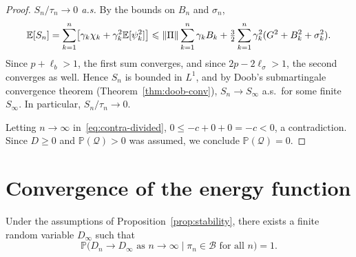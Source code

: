 \documentclass[a4paper,oneside,11pt]{report}
\newcommand{\Prob}{\mathbb{P}}
\newcommand{\calB}{\mathcal{B}}
\newcommand{\calQ}{\mathcal{Q}}
\newcommand{\norm}[1]{\| #1 \|}
\numberwithin{theorem}{chapter}
\numberwithin{equation}{chapter}
\begin{document}
\begin{proof}
  \emph{$S_n/\tau_n \to 0$ a.s.}\; By the bounds on $B_n$ and
  $\sigma_n$,
  \begin{equation}
    \E[S_n] = \sum_{k=1}^n \bigl[\gamma_k \chi_k
      + \gamma_k^2 \E[\psi_k^2]\bigr]
    \le \norm{\Pi}\sum_{k=1}^n \gamma_k B_k
    + \tfrac{3}{2}\sum_{k=1}^n \gamma_k^2(G^2 + B_k^2 + \sigma_k^2).
    \label{eq:ES-bound}
  \end{equation}
  Since $p + \ell_b > 1$, the first sum converges, and since
  $2p - 2\ell_\sigma > 1$, the second converges as well. Hence $S_n$
  is bounded in $L^1$, and by Doob's submartingale convergence theorem
  (Theorem~\ref{thm:doob-conv}), $S_n \to S_\infty$ a.s.\ for some
  finite $S_\infty$. In particular, $S_n / \tau_n \to 0$.

  Letting $n \to \infty$ in~\eqref{eq:contra-divided},
  $0 \le -c + 0 + 0 = -c < 0$, a contradiction. Since $D \ge 0$
  and $\Prob(\calQ) > 0$ was assumed, we conclude $\Prob(\calQ) = 0$.
\end{proof}

\section{Convergence of the energy function}
\label{sec:energy-conv}

\begin{proposition}
  \label{prop:energy-conv}
  Under the assumptions of Proposition~\ref{prop:stability}, there
  exists a finite random variable $D_\infty$ such that
  \begin{equation}
    \label{eq:D-convergence}
    \Prob\bigl(D_n \to D_\infty \text{ as } n \to \infty
    \mid \pi_n \in \calB \text{ for all } n\bigr) = 1.
  \end{equation}
\end{proposition}
\end{document}
